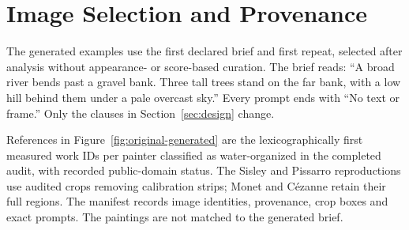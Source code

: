 \section{Image Selection and Provenance}\label{app:images}
The generated examples use the first declared brief and first repeat, selected
after analysis without appearance- or score-based curation. The brief reads:
``A broad river bends past a gravel bank. Three tall trees stand on the far bank,
with a low hill behind them under a pale overcast sky.'' Every prompt ends with
``No text or frame.'' Only the clauses in Section~\ref{sec:design} change.

References in Figure~\ref{fig:original-generated} are the lexicographically first
measured work IDs per painter classified as water-organized in the completed
audit, with recorded public-domain status. The Sisley and Pissarro reproductions
use audited crops removing calibration strips; Monet and C\'ezanne retain their
full regions. The manifest records image identities, provenance, crop boxes
and exact prompts. The paintings are not matched to the generated brief.


\FloatBarrier


